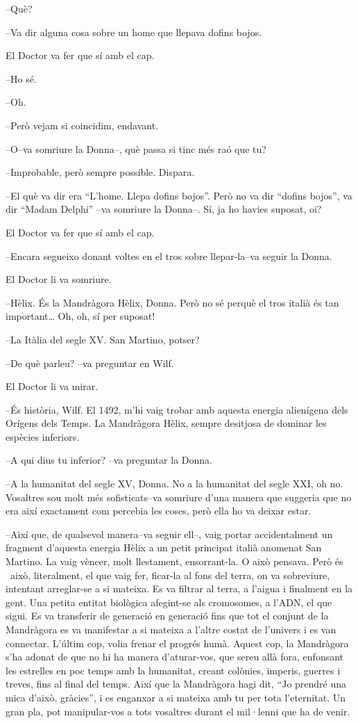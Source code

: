 --Què?

--Va dir alguna cosa sobre un home que llepava dofins bojos.

El Doctor va fer que sí amb el cap.

--Ho sé.

--Oh.

--Però vejam si coincidim, endavant.

--O--va somriure la Donna--, què passa si tinc més raó que tu?

--Improbable, però sempre possible. Dispara.

--El què va dir era ``L'home. Llepa dofins bojos''. Però no va dir
``dofins bojos'', va dir ``Madam Delphi'' --va somriure la Donna--. Sí,
ja ho havies suposat, oi?

El Doctor va fer que sí amb el cap.

--Encara segueixo donant voltes en el tros sobre llepar-la--va seguir la
Donna.

El Doctor li va somriure.

--Hèlix. És la Mandràgora Hèlix, Donna. Però no sé perquè el tros italià
és tan important\ldots{} Oh, oh, sí per suposat!

--La Itàlia del segle XV. San Martino, potser?

--De què parleu? --va preguntar en Wilf.

El Doctor li va mirar.

--És història, Wilf. El 1492, m'hi vaig trobar amb aquesta energia
alienígena dels Orígens dels Temps. La Mandràgora Hèlix, sempre
desitjosa de dominar les espècies inferiors.

--A qui dius tu inferior? --va preguntar la Donna.

--A la humanitat del segle XV, Donna. No a la humanitat del segle XXI,
oh no. Vosaltres sou molt més sofisticats--va somriure d'una manera que
suggeria que no era així exactament com percebia les coses, però ella ho
va deixar estar.

--Així que, de qualsevol manera--va seguir ell--, vaig portar
accidentalment un fragment d'aquesta energia Hèlix a un petit principat
italià anomenat San Martino. La vaig vèncer, molt llestament,
ensorrant-la. O això pensava. Però és ~això, literalment, el que vaig
fer, ficar-la al fons del terra, on va sobreviure, intentant arreglar-se
a si mateixa. Es va filtrar al terra, a l'aigua i finalment en la gent.
Una petita entitat biològica afegint-se als cromosomes, a l'ADN, el que
sigui. Es va transferir de generació en generació fins que tot el
conjunt de la Mandràgora es va manifestar a si mateixa a l'altre costat
de l'univers i es van connectar. L'últim cop, volia frenar el progrés
humà. Aquest cop, la Mandràgora s'ha adonat de que no hi ha manera
d'aturar-vos, que sereu allà fora, enfonsant les estrelles en poc temps
amb la humanitat, creant colònies, imperis, guerres i treves, fins al
final del temps. Així que la Mandràgora hagi dit, ``Jo prendré una mica
d'això, gràcies'', i es enganxar a si mateixa amb tu per tota
l'eternitat. Un gran pla, pot manipular-vos a tots vosaltres durant el
mil·lenni que ha de venir.

